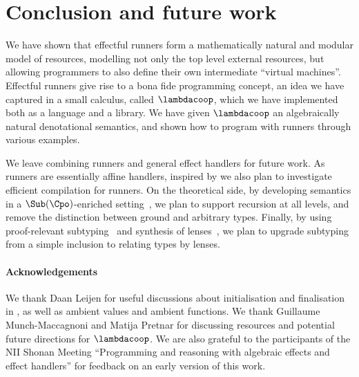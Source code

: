 
\section{Conclusion and future work}
\label{sect:conclusion}

We have shown that effectful runners form a mathematically natural
and modular model of resources, modelling not only the top level external resources,
but allowing programmers to also define their own intermediate ``virtual machines''.
Effectful runners give rise to a bona fide programming concept, an idea we have captured
in a small calculus, called $\lambdacoop$, which we have implemented both as a
language and a library. We have given $\lambdacoop$
an algebraically natural denotational semantics, and shown how to program
with runners through various examples.

We leave combining runners and general effect handlers for future work.
%
As runners are essentially affine handlers, inspired by 
we also plan to investigate efficient compilation for runners.
%
On the theoretical side, by developing semantics in a $\Sub(\Cpo)$-enriched
setting~\cite{Power:EnrichedLawvereTheories}, we plan to support recursion at
all levels, and remove the distinction between ground and arbitrary types.
Finally, by using proof-relevant subtyping~\cite{Saleh:ExplicitSybTyping} and
synthesis of lenses~\cite{Miltner:SynthesizingSymmLenses}, we plan to upgrade 
subtyping from a simple inclusion to relating types by lenses.



\paragraph{Acknowledgements}
We thank Daan Leijen for useful discussions about initialisation and finalisation in , 
as well as ambient values and ambient functions. We thank  
Guillaume Munch-Maccagnoni and Matija Pretnar for discussing  
resources and potential future directions for $\lambdacoop$. We are also grateful to the participants 
of the NII Shonan Meeting ``Programming and reasoning with algebraic effects 
and effect handlers'' for feedback on an early version of this work.

\vspace{-10pt}



